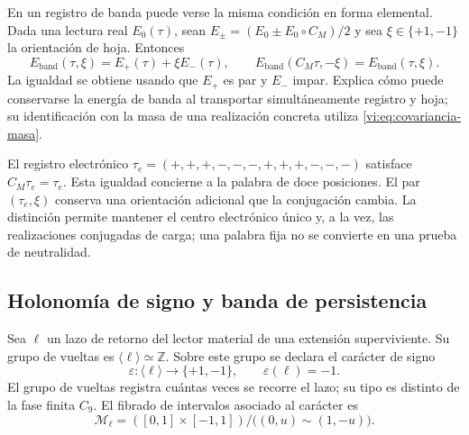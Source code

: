 En un registro de banda puede verse la misma condición en forma
elemental. Dada una lectura real $E_0(\tau)$, sean
$E_\pm=(E_0\pm E_0\circ C_M)/2$ y sea $\xi\in\{+1,-1\}$
la orientación de hoja. Entonces
\begin{equation}
 E_{\mathrm{band}}(\tau,\xi)=E_+(\tau)+\xi E_-(\tau),\qquad
 E_{\mathrm{band}}(C_M\tau,-\xi)=E_{\mathrm{band}}(\tau,\xi).
 \label{vi:eq:banda-paridad}
\end{equation}
La igualdad se obtiene usando que $E_+$ es par y $E_-$ impar.
Explica cómo puede conservarse la energía de banda al transportar
simultáneamente registro y hoja; su identificación con la masa de una
realización concreta utiliza \eqref{vi:eq:covariancia-masa}.

El registro electrónico
$\tau_e=(+,+,+,-,-,-,+,+,+,-,-,-)$ satisface $C_M\tau_e=\tau_e$.
Esta igualdad concierne a la palabra de doce posiciones. El par
$(\tau_e,\xi)$ conserva una orientación adicional que la
conjugación cambia. La distinción permite mantener el centro
electrónico único y, a la vez, las realizaciones conjugadas de carga;
una palabra fija no se convierte en una prueba de neutralidad.

\subsection{Holonomía de signo y banda de persistencia}
\label{vi:subsec:mobius}

Sea $\ell$ un lazo de retorno del lector material de una extensión
superviviente. Su grupo de vueltas es $\langle\ell\rangle\simeq
\mathbb Z$. Sobre este grupo se declara el carácter de signo
\begin{equation}
 \varepsilon:\langle\ell\rangle\longrightarrow\{+1,-1\},
 \qquad \varepsilon(\ell)=-1.
 \label{vi:eq:holonomia-signo}
\end{equation}
El grupo de vueltas registra cuántas veces se recorre el lazo; su
tipo es distinto de la fase finita $C_9$. El fibrado de intervalos
asociado al carácter es
\begin{equation}
 \mathcal M_\ell=([0,1]\times[-1,1])/
                  \bigl((0,u)\sim(1,-u)\bigr).
 \label{vi:eq:banda-mobius}
\end{equation}

